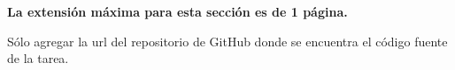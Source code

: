 \begin{mdframed}
    \textbf{La extensión máxima para esta sección es de 1 página.}
\end{mdframed}

Sólo agregar la url del repositorio de GitHub donde se encuentra el código fuente de la tarea. 